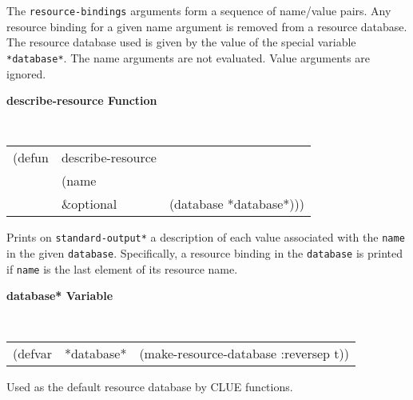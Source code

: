 \documentclass[twoside]{book}
\begin{document}
\begin{sloppy}
\begin{flushright}
{}\end{flushright}

\begin{flushright} \parbox[t]{6.125in}{
The {\tt resource-bindings} arguments form a sequence of name/value pairs.
Any resource binding for a given name argument is removed from a resource
database. The resource database used is given by the value of the special variable {\tt
*database*}.
The name arguments are not evaluated. Value arguments are
ignored.

}\end{flushright}


{\samepage
{\large {\bf describe-resource \hfill Function}} 
\begin{flushright} \parbox[t]{6.125in}{
\tt
\begin{tabular}{lll}
\raggedright
(defun & describe-resource & \\ 
& (name\\
& \&optional & (database *database*)))
\end{tabular}
\rm

}\end{flushright}}

\begin{flushright} \parbox[t]{6.125in}{
Prints  on {\tt *standard-output*} a description of each value associated with
the {\tt name} in the given {\tt database}. Specifically, a resource binding
in the {\tt database} is printed if {\tt name} is the last element of its
resource name.

}\end{flushright}


{\samepage
{\large {\bf *database* \hfill Variable}} 
\begin{flushright} \parbox[t]{6.125in}{
\tt
\begin{tabular}{lll}
\raggedright
(defvar & *database* & (make-resource-database :reversep t))
\end{tabular}
\rm

}\end{flushright}}

\begin{flushright} \parbox[t]{6.125in}{
Used as the default resource database by CLUE functions.

}\end{flushright}




\end{sloppy}
\end{document}
